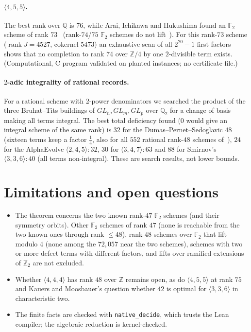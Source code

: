 \documentclass[11pt]{article}
\numberwithin{equation}{section}
\theoremstyle{definition}
\theoremstyle{remark}
\newcommand{\F}{\mathbb F}
\newcommand{\Z}{\mathbb Z}
\newcommand{\Q}{\mathbb Q}
\begin{document}
\paragraph{$\langle 4,5,5\rangle$.} The best rank over $\Q$ is $76$, while Arai, Ichikawa and Hukushima
found an $\F_2$ scheme of rank $73$~\cite{adap} (rank-$74$/$75$ $\F_2$ schemes do not lift~\cite{kw}). For this
rank-$73$ scheme ($\operatorname{rank}J=4527$, cokernel $5473$) an exhaustive scan of all $2^{20}-1$ first
factors shows that no completion to rank $74$ over $\Z/4$ by one $2$-divisible term exists. (Computational,
C program validated on planted instances; no certificate file.)

\paragraph{$2$-adic integrality of rational records.} For a rational scheme with $2$-power denominators
we searched the product of the three Bruhat--Tits buildings of $GL_n,GL_m,GL_p$ over $\Q_2$ for a change of
basis making all terms integral. The best total deficiency found ($0$ would give an integral scheme of the
same rank) is $32$ for the Dumas--Pernet--Sedoglavic $48$ (sixteen terms keep a factor $\tfrac14$, also for
all $552$ rational rank-$48$ schemes of~\cite{cloudroom}), $24$ for the AlphaEvolve $\langle2,4,5\rangle{:}32$,
$30$ for $\langle 3,4,7\rangle{:}63$ and $88$ for Smirnov's $\langle 3,3,6\rangle{:}40$ (all terms
non-integral). These are search results, not lower bounds.

\section{Limitations and open questions}
\begin{itemize}
\item The theorem concerns the two known rank-$47$ $\F_2$ schemes (and their symmetry orbits). Other
$\F_2$ schemes of rank $47$ (none is reachable from the two known ones through rank $\le 48$), rank-$48$ schemes over $\F_2$ that lift modulo $4$ (none among the $72{,}057$ near the two schemes), schemes with two or more
defect terms with different factors, and lifts over ramified extensions of $\Z_2$ are not excluded.
\item Whether $\langle4,4,4\rangle$ has rank $48$ over $\Z$ remains open, as do $\langle 4,5,5\rangle$ at
rank $75$ and Kauers and Moosbauer's question whether $42$ is optimal for $\langle3,3,6\rangle$ in
characteristic two.
\item The finite facts are checked with \texttt{native\_decide}, which trusts the Lean compiler; the
algebraic reduction is kernel-checked.
\end{itemize}
\end{document}
